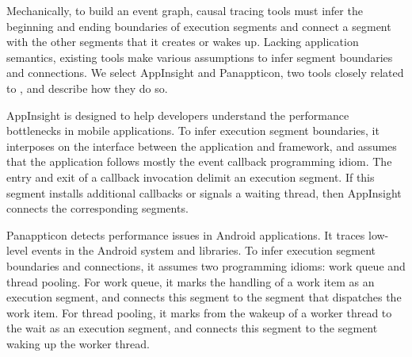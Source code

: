 Mechanically, to build an event graph, causal tracing tools must infer the
beginning and ending boundaries of execution segments and connect a
segment with the other segments that it creates or wakes up. Lacking
application semantics, existing tools make various assumptions to infer
segment boundaries and connections.  We select AppInsight and Panappticon,
two tools closely related to \xxx, and describe how they do so.

AppInsight is designed to help developers understand the performance
bottlenecks in mobile applications.  To infer execution segment
boundaries, it interposes on the interface between the application and
framework, and assumes that the application follows mostly the event
callback programming idiom.  The entry and exit of a callback invocation
delimit an execution segment.  If this segment installs additional
callbacks or signals a waiting thread, then AppInsight connects the
corresponding segments.

Panappticon detects performance issues in Android applications. It traces
low-level events in the Android system and libraries.  To infer execution
segment boundaries and connections, it assumes two programming idioms:
work queue and thread pooling.  For work queue, it marks the handling of a
work item as an execution segment, and connects this segment to the
segment that dispatches the work item.  For thread pooling, it marks from
the wakeup of a worker thread to the wait as an execution segment, and
connects this segment to the segment waking up the worker thread.




